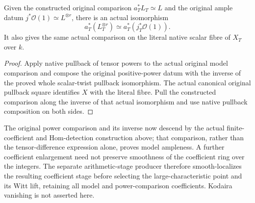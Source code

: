 \begin{lemma}
\label{lem:kn-arithmetic-original-line-power-fibre}
\leanok
{}
Given the constructed original comparison $a_T^*L_T\simeq L$ and the
original ample datum $j^*\mathcal O(1)\simeq L^{\otimes r}$, there is
an actual isomorphism
\[
a_T^*(L_T^{\otimes r})\simeq a_T^*(j_T^*\mathcal O(1)).
\]
It also gives the same actual comparison on the literal native scalar fibre
of $X_T$ over $k$.
\end{lemma}
\begin{proof}
Apply native pullback of tensor powers to the actual original model
comparison and compose the original positive-power datum with the
inverse of the proved whole scalar-twist pullback isomorphism.
The actual canonical original pullback square identifies $X$ with the
literal fibre. Pull the constructed comparison along the inverse of that
actual isomorphism and use native pullback composition on both sides.
\end{proof}

\begin{remark}
The original power comparison and its inverse now descend by the actual
finite-coefficient and Hom-detection construction above; that comparison,
rather than the tensor-difference expression alone, proves model ampleness.
A further coefficient enlargement need not preserve smoothness of the
coefficient ring over the integers. The separate arithmetic-stage producer
therefore smooth-localizes the resulting coefficient stage before selecting
the large-characteristic point and its Witt lift, retaining all model and
power-comparison coefficients. Kodaira vanishing is not asserted here.
\end{remark}

